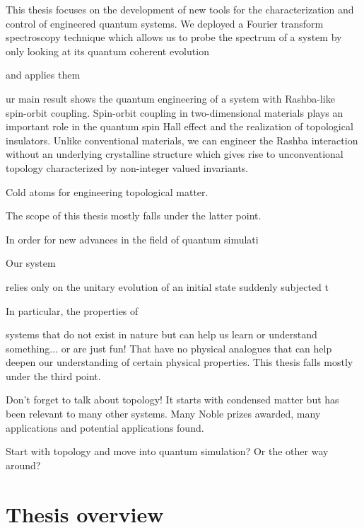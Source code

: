 This thesis focuses on the development of new tools for the characterization and control of engineered quantum systems. We deployed a Fourier transform spectroscopy technique which allows us to probe the spectrum of a system by only looking at its quantum coherent evolution



 and applies them 




ur main result shows the quantum engineering of a system with Rashba-like~\cite{bychkov_oscillatory_1984} spin-orbit coupling. Spin-orbit coupling in two-dimensional materials plays an important role in the quantum spin Hall effect and the realization of topological insulators. Unlike conventional materials, we can engineer the Rashba interaction without an underlying crystalline structure which gives rise to unconventional topology characterized by non-integer valued invariants. 


Cold atoms for engineering topological matter. 

The scope of this thesis mostly falls under the latter point. 

In order for new advances in the field of quantum simulati 

Our system 

relies only on the unitary evolution of an initial state suddenly subjected t


In particular, the properties of 



systems that do not exist in nature but can help us learn or understand something... or are just fun!
That have no physical analogues that can help deepen our understanding of certain physical properties. This thesis falls mostly under the third point. 






Don't forget to talk about topology! It starts with condensed matter but has been relevant to many other systems. Many Noble prizes awarded, many applications and potential applications found. 

Start with topology and move into quantum simulation? Or the other way around?


\section{Thesis overview}

